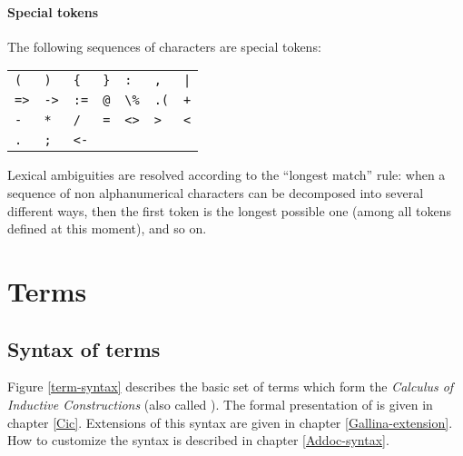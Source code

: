 \paragraph{Special tokens}
The following sequences of characters are special tokens:
\begin{center}
\begin{tabular}{lllllll}
\verb!(!  &
\verb!)!  &
\verb!{!  &
\verb!}!  &
\verb!:!  &
\verb!,!  &
\verb!|!  \\
\verb!=>! &
\verb!->! &
\verb!:=! &
\verb!@!  &
\verb!\%! &
\verb!.(! &
\verb!+!  \\
\verb!-!  &
\verb!*!  &
\verb!/!  &
\verb!=!  &
\verb!<>! &
\verb!>!  &
\verb!<!  \\
\verb!.!  &
\verb!;!  &
\verb!<-! &
\end{tabular}
\end{center}

Lexical ambiguities are resolved according to the ``longest match''
rule: when a sequence of non alphanumerical characters can be decomposed
into several different ways, then the first token is the longest
possible one (among all tokens defined at this moment), and so on.

\section{Terms}\label{term}
\subsection{Syntax of terms}

Figure \ref{term-syntax} describes the basic set of terms which form
the {\em Calculus
of Inductive Constructions} (also called \CIC). The formal
presentation of {\CIC} is given in chapter \ref{Cic}. Extensions of
this syntax are given in chapter
\ref{Gallina-extension}. How to customize the syntax is described in
chapter \ref{Addoc-syntax}.

